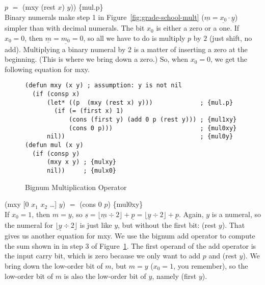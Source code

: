 \hspace*{2cm} $p$ $=$ \textsf{(mxy (rest $x$) $y$))} \hfill \{mul.p\}
\\

Binary numerals make step 1 in Figure~\ref{fig:grade-school-mult}
($\underline{m} = \underline{x_0} \cdot \underline{y}$)
simpler than with decimal numerals.
The bit $x_0$ is either a zero or a one.
If $x_0 = 0$, then $\underline{m} = \underline{m_0} = 0$, so all
we have to do is multiply $p$ by $2$ (just shift, no add).
Multiplying a binary numeral by $2$ is a matter
of inserting a zero at the beginning.
(This is where we bring down a zero.)
So, when $x_0 = 0$, we get the following equation for \textsf{mxy}.

\begin{figure}
\begin{Verbatim}
(defun mxy (x y) ; assumption: y is not nil
  (if (consp x)
      (let* ((p  (mxy (rest x) y)))             ; {mul.p}
        (if (= (first x) 1)
            (cons (first y) (add 0 p (rest y))) ; {mul1xy}
            (cons 0 p)))                        ; {mul0xy}
      nil))                                     ; {mul0y}
(defun mul (x y)
  (if (consp y)
      (mxy x y) ; {mulxy}
      nil))     ; {mulx0}
\end{Verbatim}
\label{bignum-mul-defun}
\caption{Bignum Multiplication Operator}
\label{fig:bignum-mul-defun}
\end{figure}

\hspace*{2cm} \textsf{(mxy [$0$ $x_1$ $x_2$ \dots] $y$)} $=$ \textsf{(cons $0$ $p$)} \hfill \{mul0xy\}
\\

If $x_0 = 1$, then $m = y$,
so $\underline{s} = \lfloor \underline{m}\div 2\rfloor + \underline{p} = \lfloor \underline{y}\div 2\rfloor + \underline{p}$.
Again, $y$ is a numeral, so the numeral for $\lfloor \underline{y}\div 2\rfloor$
is just like $y$, but without the first bit: (rest $y$).
That gives us another equation for \textsf{mxy}.
We use the bignum \textsf{add} operator to compute the sum
shown in in step 3 of Figure~\ref{fig:bignum-mul-defun}.
The first operand of the \textsf{add} operator is the input carry bit,
which is zero because we only want to add $p$ and \textsf{(rest $y$)}.
We bring down the low-order bit of $m$, but $m = y$
($x_0 = 1$, you remember), so the low-order bit of $m$
is also the low-order bit of $y$, namely \textsf{(first $y$)}.

